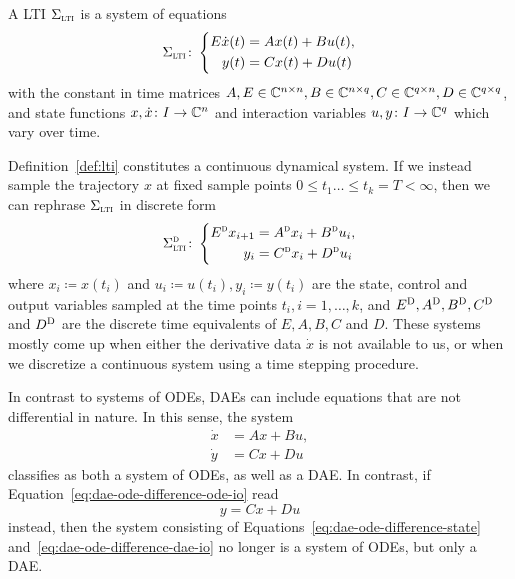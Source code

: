 \begin{definition}\label{def:lti}
    A \acl{LTI} $\Sigma_{\textnormal{\scshape lti}}$ is a system of equations
    \begin{equation}\label{eq:lti}
        \Sigma_{\textnormal{\scshape lti}} \colon \left\lbrace
        \begin{aligned}
            E \dot{x}(t) &= A x(t) + B u(t), \\
            y(t) &= C x(t) + D u(t)
        \end{aligned}
        \right.
    \end{equation}
    with the constant in time matrices $A, E \in \mathbb{C}^{n \times n}, B \in \mathbb{C}^{n \times q}, C \in \mathbb{C}^{q \times n}, D \in \mathbb{C}^{q \times q}$, and state functions $x, \dot{x} \colon I \to \mathbb{C}^n$ and interaction variables $u, y \colon I \to \mathbb{C}^q$ which vary over time.
\end{definition}

\begin{remark}
    Definition~\ref{def:lti} constitutes a continuous dynamical system.
    If we instead sample the trajectory $x$ at fixed sample points $0 \leq t_1 \dots \leq t_k = T < \infty$, then we can rephrase $\Sigma_{\textnormal{\scshape lti}}$ in discrete form
    \begin{equation*}
        \Sigma_{\textnormal{\scshape lti}}^{\textnormal{\scshape d}} \colon \left\lbrace
        \begin{aligned}
            E^{\textnormal{\scshape d}} x_{i + 1} &= A^{\textnormal{\scshape d}} x_i + B^{\textnormal{\scshape d}} u_i, \\
            y_i &= C^{\textnormal{\scshape d}} x_i + D^{\textnormal{\scshape d}} u_i
        \end{aligned}
        \right.
    \end{equation*}
    where $x_i \coloneqq x(t_i)$ and $u_i \coloneqq u(t_i), y_i \coloneqq y(t_i)$ are the state, control and output variables sampled at the time points $t_i, i = 1, \dots, k$, and $E^{\textnormal{\scshape D}}, A^{\textnormal{\scshape D}}, B^{\textnormal{\scshape D}}, C^{\textnormal{\scshape D}}$ and $D^{\textnormal{\scshape D}}$ are the discrete time equivalents of $E, A, B, C$ and $D$.
    These systems mostly come up when either the derivative data $\dot{x}$ is not available to us, or when we discretize a continuous system using a time stepping procedure.
\end{remark}

\begin{remark}
    In contrast to systems of \acp{ODE}, \acp{DAE} can include equations that are not differential in nature.
    In this sense, the system
    \begin{align}
        \dot{x} &= A x + B u, \label{eq:dae-ode-difference-state}\\
        \dot{y} &= C x + D u\label{eq:dae-ode-difference-ode-io}
    \end{align}
    classifies as both a system of \acp{ODE}, as well as a \ac{DAE}.
    In contrast, if Equation~\eqref{eq:dae-ode-difference-ode-io} read
    \begin{equation}\label{eq:dae-ode-difference-dae-io}
        y = C x + D u
    \end{equation}
    instead, then the system consisting of Equations~\eqref{eq:dae-ode-difference-state} and~\eqref{eq:dae-ode-difference-dae-io} no longer is a system of \acp{ODE}, but only a \ac{DAE}.
\end{remark}

